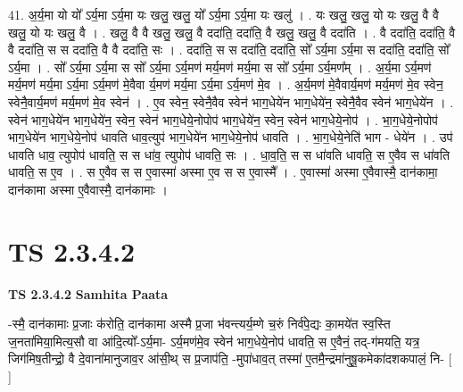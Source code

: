 \documentclass[17pt]{extarticle}
\begin{document}
41. अ॒र्य॒मा यो यो᳚ ऽर्य॒मा ऽर्य॒मा यः खलु॒ खलु॒ यो᳚ ऽर्य॒मा ऽर्य॒मा यः खलु॑ । . यः खलु॒ खलु॒ यो यः खलु॒ वै वै खलु॒ यो यः खलु॒ वै । . खलु॒ वै वै खलु॒ खलु॒ वै ददा॑ति॒ ददा॑ति॒ वै खलु॒ खलु॒ वै ददा॑ति । . वै ददा॑ति॒ ददा॑ति॒ वै वै ददा॑ति॒ स स ददा॑ति॒ वै वै ददा॑ति॒ सः । . ददा॑ति॒ स स ददा॑ति॒ ददा॑ति॒ सो᳚ ऽर्य॒मा ऽर्य॒मा स ददा॑ति॒ ददा॑ति॒ सो᳚ ऽर्य॒मा । . सो᳚ ऽर्य॒मा ऽर्य॒मा स सो᳚ ऽर्य॒मा ऽर्य॒मण॑ मर्य॒मण॑ मर्य॒मा स सो᳚ ऽर्य॒मा ऽर्य॒मण᳚म् । . अ॒र्य॒मा ऽर्य॒मण॑ मर्य॒मण॑ मर्य॒मा ऽर्य॒मा ऽर्य॒मण॑ मे॒वैवा र्य॒मण॑ मर्य॒मा ऽर्य॒मा ऽर्य॒मण॑ मे॒व । . अ॒र्य॒मण॑ मे॒वैवार्य॒मण॑ मर्य॒मण॑ मे॒व स्वेन॒ स्वेनै॒वार्य॒मण॑ मर्य॒मण॑ मे॒व स्वेन॑ । . ए॒व स्वेन॒ स्वेनै॒वैव स्वेन॑ भाग॒धेये॑न भाग॒धेये॑न॒ स्वेनै॒वैव स्वेन॑ भाग॒धेये॑न । . स्वेन॑ भाग॒धेये॑न भाग॒धेये॑न॒ स्वेन॒ स्वेन॑ भाग॒धेये॒नोपोप॑ भाग॒धेये॑न॒ स्वेन॒ स्वेन॑ भाग॒धेये॒नोप॑ । . भा॒ग॒धेये॒नोपोप॑ भाग॒धेये॑न भाग॒धेये॒नोप॑ धावति धाव॒त्युप॑ भाग॒धेये॑न भाग॒धेये॒नोप॑ धावति । . भा॒ग॒धेये॒नेति॑ भाग - धेये॑न । . उप॑ धावति धाव॒ त्युपोप॑ धावति॒ स स धा॑व॒ त्युपोप॑ धावति॒ सः । . धा॒व॒ति॒ स स धा॑वति धावति॒ स ए॒वैव स धा॑वति धावति॒ स ए॒व । . स ए॒वैव स स ए॒वास्मा॑ अस्मा ए॒व स स ए॒वास्मै᳚ । . ए॒वास्मा॑ अस्मा ए॒वैवास्मै॒ दान॑कामा॒ दान॑कामा अस्मा ए॒वैवास्मै॒ दान॑कामाः । \newline
\pagebreak
{}

\section{ TS 2.3.4.2 }

\textbf{TS 2.3.4.2 } \newline
\textbf{Samhita Paata} \newline

-स्मै॒ दान॑कामाः प्र॒जाः क॑रोति॒ दान॑कामा अस्मै प्र॒जा भ॑वन्त्यर्य॒म्णे च॒रुं निर्व॑पे॒द्यः का॒मये॑त स्व॒स्ति ज॒नता॑मिया॒मित्य॒सौ वा आ॑दि॒त्यो᳚-ऽर्य॒मा- ऽर्य॒मण॑मे॒व स्वेन॑ भाग॒धेये॒नोप॑ धावति॒ स ए॒वैनं॒ तद्-ग॑मयति॒ यत्र॒ जिग॑मिष॒तीन्द्रो॒ वै दे॒वाना॑मानुजाव॒र आ॑सी॒थ् स प्र॒जाप॑ति॒ -मुपा॑धाव॒त् तस्मा॑ ए॒तमै॒न्द्रमा॑नुषू॒कमेका॑दशकपालं॒ नि- [  ] \newline
\end{document}
